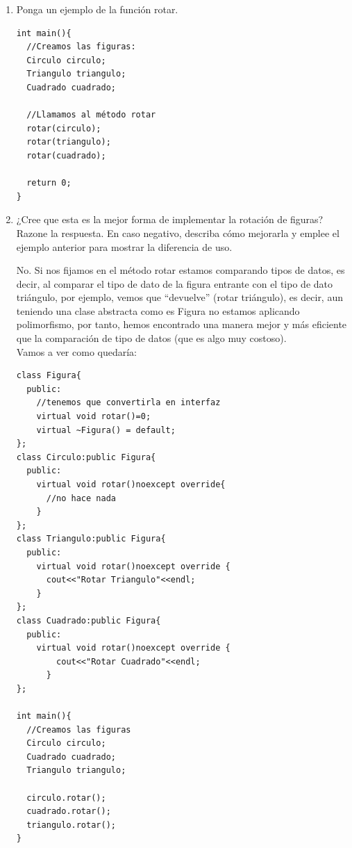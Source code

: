 \begin{enumerate}[label = \alph*)]
  \item Ponga un ejemplo de la función rotar.

\begin{verbatim}
int main(){
  //Creamos las figuras:
  Circulo circulo;
  Triangulo triangulo;
  Cuadrado cuadrado;

  //Llamamos al método rotar
  rotar(circulo);
  rotar(triangulo);
  rotar(cuadrado);

  return 0;
}
\end{verbatim}
  \item ¿Cree que esta es la mejor forma de implementar la rotación de figuras? Razone la respuesta. En caso negativo, describa cómo mejorarla y emplee el ejemplo anterior para mostrar la diferencia de uso.
  
  No. Si nos fijamos en el método rotar estamos comparando tipos de datos, es decir, al comparar el tipo de dato de la figura entrante con el tipo de dato triángulo, por ejemplo, vemos que ``devuelve'' (rotar triángulo), es decir, aun teniendo una clase abstracta como es Figura no estamos aplicando polimorfismo, por tanto, hemos encontrado una manera mejor y más eficiente que la comparación de tipo de datos (que es algo muy costoso).\\

  Vamos a ver como quedaría:
  \begin{verbatim}
class Figura{
  public:
    //tenemos que convertirla en interfaz
    virtual void rotar()=0;
    virtual ~Figura() = default;
};
class Circulo:public Figura{
  public:
    virtual void rotar()noexcept override{
      //no hace nada
    }
};
class Triangulo:public Figura{
  public:
    virtual void rotar()noexcept override {
      cout<<"Rotar Triangulo"<<endl;
    }
};
class Cuadrado:public Figura{
  public:
    virtual void rotar()noexcept override {
        cout<<"Rotar Cuadrado"<<endl;
      }
};

int main(){
  //Creamos las figuras
  Circulo circulo;
  Cuadrado cuadrado;
  Triangulo triangulo;
  
  circulo.rotar();
  cuadrado.rotar();
  triangulo.rotar();
}
  \end{verbatim}
\end{enumerate}